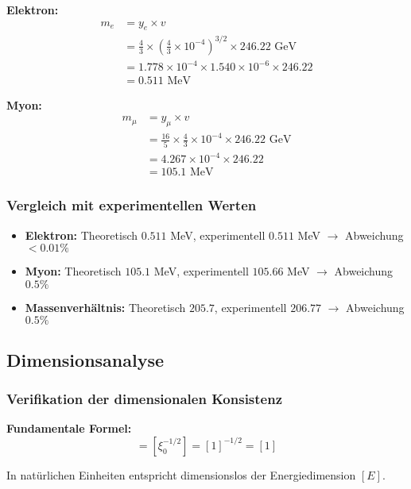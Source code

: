 \documentclass[12pt,a4paper]{article}
\theoremstyle{definition}
\begin{document}
\textbf{Elektron:}
\begin{align}
	m_e &= y_e \times v\\
	&= \frac{4}{3} \times \left(\frac{4}{3} \times 10^{-4}\right)^{3/2} \times 246.22 \text{ GeV}\\
	&= 1.778 \times 10^{-4} \times 1.540 \times 10^{-6} \times 246.22\\
	&= 0.511 \text{ MeV}
\end{align}

\textbf{Myon:}
\begin{align}
	m_\mu &= y_\mu \times v\\
	&= \frac{16}{5} \times \frac{4}{3} \times 10^{-4} \times 246.22 \text{ GeV}\\
	&= 4.267 \times 10^{-4} \times 246.22\\
	&= 105.1 \text{ MeV}
\end{align}

\subsubsection{Vergleich mit experimentellen Werten}

\begin{itemize}
	\item \textbf{Elektron:} Theoretisch $0.511$ MeV, experimentell $0.511$ MeV $\rightarrow$ Abweichung $< 0.01\%$
	\item \textbf{Myon:} Theoretisch $105.1$ MeV, experimentell $105.66$ MeV $\rightarrow$ Abweichung $0.5\%$
	\item \textbf{Massenverh{\"a}ltnis:} Theoretisch $205.7$, experimentell $206.77$ $\rightarrow$ Abweichung $0.5\%$
\end{itemize}

\subsection{Dimensionsanalyse}

\subsubsection{Verifikation der dimensionalen Konsistenz}

\textbf{Fundamentale Formel:}
\begin{equation}
	[v] = [\xi_0^{-1/2}] = [1]^{-1/2} = [1]
\end{equation}

In nat{\"u}rlichen Einheiten entspricht dimensionslos der Energiedimension $[E]$.
\end{document}
